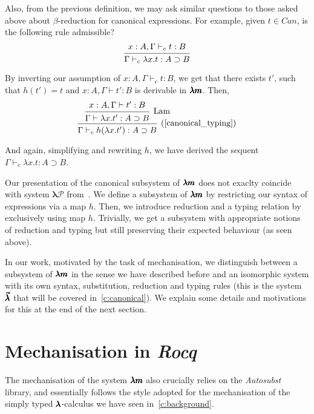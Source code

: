 Also, from the previous definition, we may ask similar questions to those asked above about $\beta$-reduction for canonical expressions.
For example, given $t \in Can$, is the following rule admissible?
\[
  \begin{prooftree}
    \hypo{ x:A, \Gamma \vdash_c t:B }
    \infer1{ \Gamma \vdash_c \lambda x.t : A \supset B } 
  \end{prooftree}
\]

By inverting our assumption of $x:A, \Gamma \vdash_c t:B$, we get that there exists $t'$, such that $h(t') = t$ and $x:A, \Gamma \vdash t':B$ is derivable in $\pmb{\lambda m}$. Then,
\[
  \begin{prooftree}
    \hypo{ x:A, \Gamma \vdash t':B }
    \infer1[Lam]{ \Gamma \vdash \lambda x . t' : A \supset B }
    \infer1[\text{(\cref{canonical_typing})}]{ \Gamma \vdash_c h(\lambda x . t') : A \supset B }
  \end{prooftree}
\]

And again, simplifying and rewriting $h$, we have derived the sequent $\Gamma \vdash_c \lambda x.t : A \supset B$.

Our presentation of the canonical subsystem of $\pmb{\lambda m}$ does not exaclty coincide with system $\pmb{\lambda \mathcal{P}}$ from~\cite[Chapter~3.1]{JCES2002}.
We define a subsystem of $\pmb{\lambda m}$ by restricting our syntax of expressions via a map $h$.
Then, we introduce reduction and a typing relation by exclusively using map $h$.
Trivially, we get a subsystem with appropriate notions of reduction and typing but still preserving their expected behaviour (as seen above).

In our work, motivated by the task of mechanisation, we distinguish between a subsystem of $\pmb{\lambda m}$ in the sense we have described before and an isomorphic system with its own syntax, substitution, reduction and typing rules (this is the system~$\pmb{\vec \lambda}$ that will be covered in~\cref{c:canonical}).
We explain some details and motivations for this at the end of the next section.


\section{Mechanisation in \textit{Rocq}}

The mechanisation of the system $\pmb{\lambda m}$ also crucially relies on the \textit{Autosubst} library, and essentially follows the style adopted for the mechanisation of the simply typed $\pmb{\lambda}$-calculus we have seen in~\cref{c:background}.

